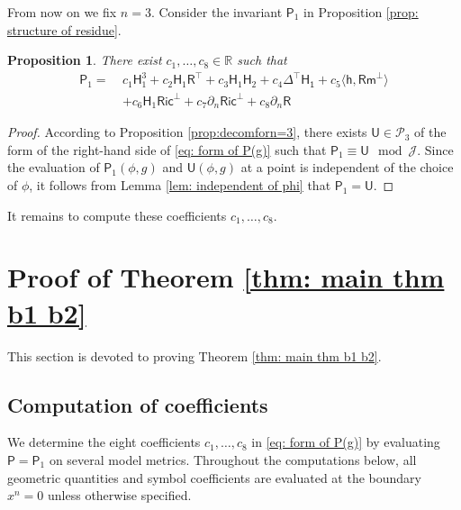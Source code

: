 \documentclass[11pt]{amsart}
\newtheorem{proposition}[theorem]{Proposition}
\theoremstyle{definition}
\numberwithin{equation}{section}
\begin{document}
 
From now on we fix $n=3$. Consider the invariant $\mathsf P_1$ in Proposition \ref{prop: structure of residue}. 
\begin{proposition}
    There exist $c_1,\dots,c_8\in\mathbb R$ such that
    \begin{equation}\label{eq: form of P(g)} 
	 	\begin{aligned}
	 		\mathsf P_1 = \ & c_1\mathsf H_1^3 + c_2\mathsf H_1\mathsf R^\top + c_3\mathsf H_1\mathsf H_2 + c_4\mathsf {\Delta^\top H_1} + c_5\langle \mathsf h, \mathsf {Rm}^\bot\rangle \\
	 		& + c_6\mathsf H_1\mathsf{Ric}^\bot + c_7\partial_n\mathsf{Ric}^\bot + c_8\partial_n\mathsf R
	 	\end{aligned}
	 \end{equation}
\end{proposition}
\begin{proof} 
According to Proposition \ref{prop:decomforn=3}, there exists $\mathsf U\in\mathcal P_3$ of the form of the right-hand side of \eqref{eq: form of P(g)} such that $\mathsf P_1\equiv\mathsf U\mod\mathcal J$. Since the evaluation of $\mathsf P_1(\phi,g)$ and $\mathsf U(\phi,g)$ at a point is independent of the choice of $\phi$, it follows from Lemma \ref{lem: independent of phi} that $\mathsf P_1 = \mathsf U$.
\end{proof}
It remains to compute these coefficients $c_1,\dots,c_8$.

\section{Proof of Theorem \ref{thm: main thm b1 b2}}\label{sec: proof of thm}

This section is devoted to proving Theorem \ref{thm: main thm b1 b2}. 

\subsection{Computation of coefficients}

We determine the eight coefficients $c_1,\dots,c_8$ in \eqref{eq: form of P(g)} by evaluating $\mathsf P=\mathsf P_1$ on several model metrics.  Throughout the computations below, all geometric quantities and symbol coefficients are evaluated at the boundary $x^n=0$ unless otherwise specified.
\end{document}
